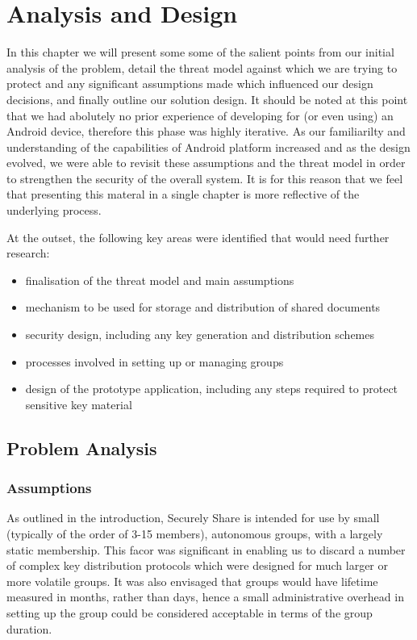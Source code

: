 
\chapter{Analysis and Design}
\label{cha:analysis}

In this chapter we will present some some of the salient points from our initial analysis of the problem, detail the threat model against which we are trying to protect and any significant assumptions made which influenced our design decisions, and finally outline our solution design.  It should be noted at this point that we had abolutely no prior experience of developing for (or even using) an Android device, therefore this phase was highly iterative.  As our familiarilty and understanding of the capabilities of Android platform increased and as the design evolved, we were able to revisit these assumptions and the threat model in order to strengthen the security of the overall system. It is for this reason that we feel that presenting this materal in a single chapter is more reflective of the underlying process.

At the outset, the following key areas were identified that would need further research:
\begin{itemize}
\item finalisation of the threat model and main assumptions
\item mechanism to be used for storage and distribution of shared documents
\item security design, including any key generation and distribution schemes
\item processes involved in setting up or managing groups
\item design of the prototype application, including any steps required to protect sensitive key material
\end{itemize}


\section{Problem Analysis}
\subsection{Assumptions}

As outlined in the introduction, Securely Share is intended for use by small (typically of the order of 3-15 members), autonomous groups, with a largely static membership.  This facor was significant in enabling us to discard a number of complex key distribution protocols which were designed for much larger or more volatile groups.  It was also envisaged that groups would have lifetime measured in months, rather than days, hence a small administrative overhead in setting up the group could be considered acceptable in terms of the group duration. 

